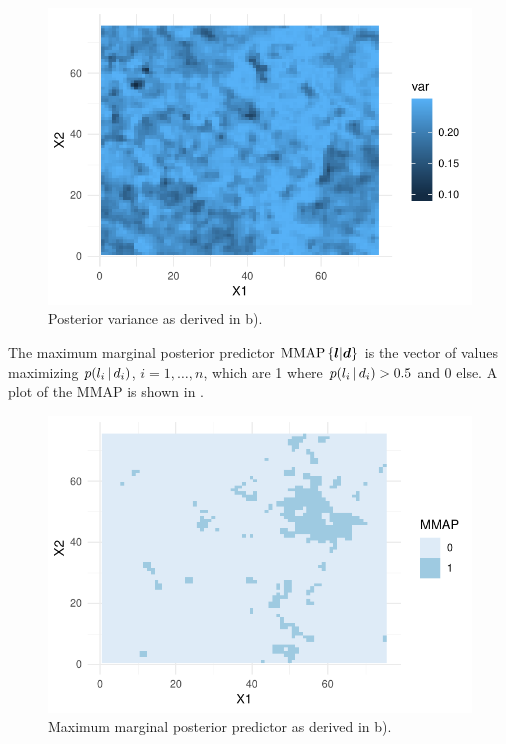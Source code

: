 \begin{figure}
    \centering
    \includegraphics{figures/b_var.pdf}
    \caption{Posterior variance as derived in b).}
    \label{fig:b_var}
\end{figure}

The maximum marginal posterior predictor $\text{MMAP}\left\{\bm{l}|\bm{d}\right\}$ is the vector of values maximizing $p(l_i \, | \, d_i)$, $i = 1, \dots, n$, which are 1 where $p(l_i \, | \, d_i) > 0.5$ and 0 else. A plot of the MMAP is shown in .

\begin{figure}
    \centering
    \includegraphics{figures/b_mmap.pdf}
    \caption{Maximum marginal posterior predictor as derived in b).}
    \label{fig:b_mmap}
\end{figure}

